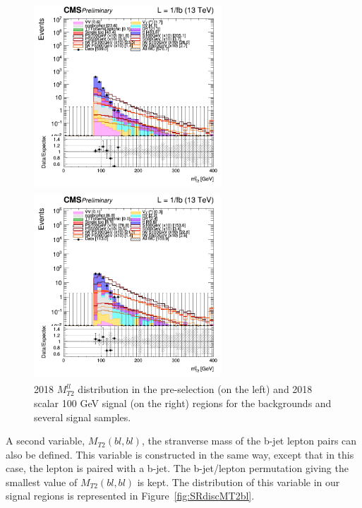 \documentclass[a4paper, 10pt, openright]{report}
\begin{document}
\begin{figure}[htbp]
\centering
\begin{minipage}[b]{.48\textwidth}
\includegraphics[width=7cm, height=7cm]{figs/2018/log_cratio_topCR_ll_mt2ll.png}
\end{minipage}\hfill
\begin{minipage}[b]{.48\textwidth}
\includegraphics[width=7cm, height=7cm]{figs/2018/log_cratio_topCR_ll_DNN_signal0_scalar100_mt2ll.png}
\end{minipage} \hfill
\caption{2018 $M_{T2}^{ll}$ distribution in the pre-selection (on the left) and 2018 scalar 100 GeV signal (on the right) regions for the backgrounds and several signal samples.}
\label{fig:SRdiscMT2}
\end{figure}

A second variable, $M_{T2}(bl, bl)$, the stranverse mass of the b-jet lepton pairs can also be defined. This variable is constructed in the same way, except that in this case, the lepton is paired with a b-jet. The b-jet/lepton permutation giving the smallest value of $M_{T2}(bl, bl)$ is kept. The distribution of this variable in our signal regions is represented in Figure~\ref{fig:SRdiscMT2bl}.
\end{document}
